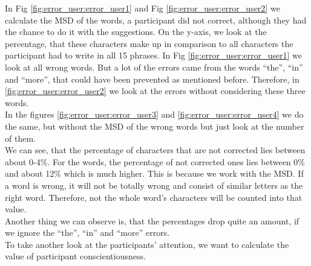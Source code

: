 In Fig \cref{fig:error_user:error_user1} and Fig \cref{fig:error_user:error_user2} we calculate the MSD of the words, a participant did not correct, although they had the chance to do it with the suggestions. On the y-axis, we look at the percentage, that these characters make up in comparison to all characters the participant had to write in all 15 phrases. In Fig \cref{fig:error_user:error_user1} we look at all wrong words. But a lot of the errors came from the words ``the'', ``in'' and ``more'', that could have been prevented as mentioned before. Therefore, in \cref{fig:error_user:error_user2} we look at the errors without considering these three words.\\
In the figures \cref{fig:error_user:error_user3} and \cref{fig:error_user:error_user4} we do the same, but without the MSD of the wrong words but just look at the number of them.\\
We can see, that the percentage of characters that are not corrected lies between about 0-4\%. For the words, the percentage of not corrected ones lies between 0\% and about 12\% which is much higher. This is because we work with the MSD. If a word is wrong, it will not be totally wrong and consist of similar letters as the right word. Therefore, not the whole word's characters will be counted into that value.\\
Another thing we can observe is, that the percentages drop quite an amount, if we ignore the ``the'', ``in'' and ``more'' errors.\\
To take another look at the participants' attention, we want to calculate the value of participant conscientiousness.

